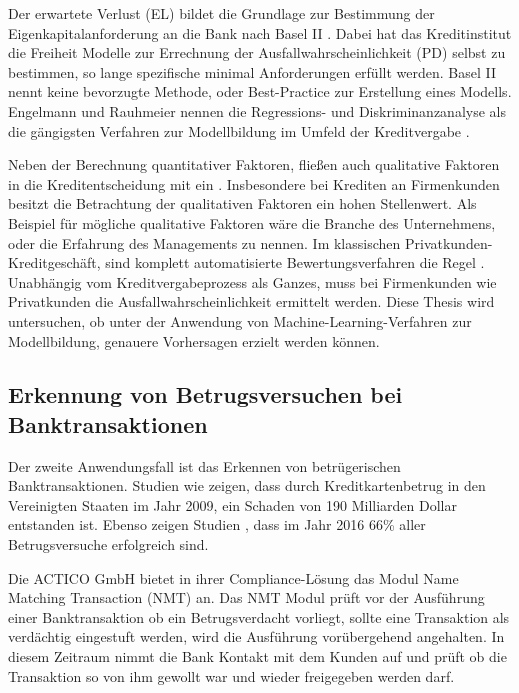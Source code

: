 Der erwartete Verlust (EL) bildet die Grundlage zur Bestimmung der Eigenkapitalanforderung an die Bank nach Basel II \cite[vgl. S. 31]{ER11}. Dabei hat das Kreditinstitut die Freiheit Modelle zur Errechnung der Ausfallwahrscheinlichkeit (PD) selbst zu bestimmen, so lange spezifische minimal Anforderungen erfüllt werden. Basel II nennt keine bevorzugte Methode, oder Best-Practice zur Erstellung eines Modells. Engelmann und Rauhmeier nennen die Regressions- und Diskriminanzanalyse als die gängigsten Verfahren zur Modellbildung im Umfeld der Kreditvergabe \cite{ER11}. 

Neben der Berechnung quantitativer Faktoren, fließen auch qualitative Faktoren in die Kreditentscheidung mit ein \cite[vgl. S. 25 ff.]{NB04}. Insbesondere bei Krediten an Firmenkunden besitzt die Betrachtung der qualitativen Faktoren ein hohen Stellenwert. Als Beispiel für mögliche qualitative Faktoren wäre die Branche des Unternehmens, oder die Erfahrung des Managements zu nennen. Im klassischen Privatkunden-Kreditgeschäft, sind komplett automatisierte Bewertungsverfahren die Regel \cite[vgl. S. 31 ff.]{NB04}. Unabhängig vom  Kreditvergabeprozess als Ganzes, muss bei Firmenkunden wie Privatkunden die Ausfallwahrscheinlichkeit ermittelt werden. Diese Thesis wird untersuchen, ob unter der Anwendung von Machine-Learning-Verfahren zur Modellbildung, genauere Vorhersagen erzielt werden können.   

\subsection{Erkennung von Betrugsversuchen bei Banktransaktionen}
\label{subsec:Banktransaktionen3}

Der zweite Anwendungsfall ist das Erkennen von betrügerischen Banktransaktionen. Studien wie \cite{FB11} zeigen, dass durch Kreditkartenbetrug in den Vereinigten Staaten im Jahr 2009, ein Schaden von 190 Milliarden Dollar entstanden ist. Ebenso zeigen Studien \cite[vgl. S. 24]{LE16}, dass im Jahr 2016 66\% aller Betrugsversuche erfolgreich sind. 

Die ACTICO GmbH bietet in ihrer Compliance-Lösung das Modul Name Matching Transaction (NMT) an. Das NMT Modul prüft vor der Ausführung einer Banktransaktion ob ein Betrugsverdacht vorliegt, sollte eine Transaktion als verdächtig eingestuft werden, wird die Ausführung vorübergehend angehalten. In diesem Zeitraum nimmt die Bank Kontakt mit dem Kunden auf und prüft ob die Transaktion so von ihm gewollt war und wieder freigegeben werden darf. 

